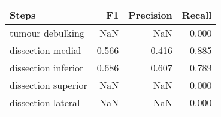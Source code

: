 \begin{tabular}{lrrr}
\toprule
Steps & F1 & Precision & Recall \\
\midrule
tumour debulking & NaN & NaN & 0.000 \\
dissection medial & 0.566 & 0.416 & 0.885 \\
dissection inferior & 0.686 & 0.607 & 0.789 \\
dissection superior & NaN & NaN & 0.000 \\
dissection lateral & NaN & NaN & 0.000 \\
\bottomrule
\end{tabular}
